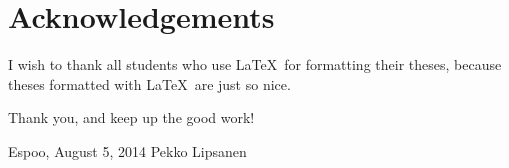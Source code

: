\documentclass[12pt,a4paper,oneside,pdftex]{report}
\newcommand{\DATE}{August 5, 2014}
\newcommand{\AUTHOR}{Pekko Lipsanen}
\begin{document}
\startcoverpage








\chapter*{Acknowledgements}

I wish to thank all students who use \LaTeX\ for formatting their theses,
because theses formatted with \LaTeX\ are just so nice.

Thank you, and keep up the good work!
\vskip 10mm

\noindent Espoo, \DATE
\vskip 5mm
\noindent\AUTHOR

\cleardoublepage

\end{document}
